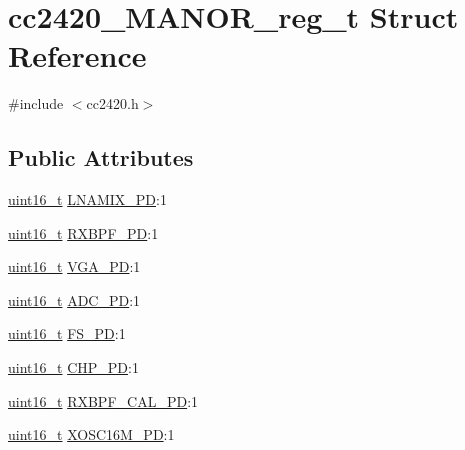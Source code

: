 \hypertarget{structcc2420___m_a_n_o_r__reg__t}{}\section{cc2420\+\_\+\+M\+A\+N\+O\+R\+\_\+reg\+\_\+t Struct Reference}
\label{structcc2420___m_a_n_o_r__reg__t}


{\ttfamily \#include $<$cc2420.\+h$>$}

\subsection*{Public Attributes}
\begin{DoxyCompactItemize}
\item 
\hyperlink{_p_e___types_8h_a1f1825b69244eb3ad2c7165ddc99c956}{uint16\+\_\+t} \hyperlink{structcc2420___m_a_n_o_r__reg__t_aa37050bc82f0bd9813fc5aee79f0946b}{L\+N\+A\+M\+I\+X\+\_\+\+PD}\+:1
\item 
\hyperlink{_p_e___types_8h_a1f1825b69244eb3ad2c7165ddc99c956}{uint16\+\_\+t} \hyperlink{structcc2420___m_a_n_o_r__reg__t_ab6fc443a13c0084b4a10cbcd4fc43e8d}{R\+X\+B\+P\+F\+\_\+\+PD}\+:1
\item 
\hyperlink{_p_e___types_8h_a1f1825b69244eb3ad2c7165ddc99c956}{uint16\+\_\+t} \hyperlink{structcc2420___m_a_n_o_r__reg__t_a49de9e54c918acb5f43ce06b062128c3}{V\+G\+A\+\_\+\+PD}\+:1
\item 
\hyperlink{_p_e___types_8h_a1f1825b69244eb3ad2c7165ddc99c956}{uint16\+\_\+t} \hyperlink{structcc2420___m_a_n_o_r__reg__t_a00ea066dac6d968b8ed582477ec31149}{A\+D\+C\+\_\+\+PD}\+:1
\item 
\hyperlink{_p_e___types_8h_a1f1825b69244eb3ad2c7165ddc99c956}{uint16\+\_\+t} \hyperlink{structcc2420___m_a_n_o_r__reg__t_a1b0877e56d312aa63e842a4c9a469640}{F\+S\+\_\+\+PD}\+:1
\item 
\hyperlink{_p_e___types_8h_a1f1825b69244eb3ad2c7165ddc99c956}{uint16\+\_\+t} \hyperlink{structcc2420___m_a_n_o_r__reg__t_af76278d85244bce83b1092f640bf295e}{C\+H\+P\+\_\+\+PD}\+:1
\item 
\hyperlink{_p_e___types_8h_a1f1825b69244eb3ad2c7165ddc99c956}{uint16\+\_\+t} \hyperlink{structcc2420___m_a_n_o_r__reg__t_a971a1911726af6d5430a64794535aa19}{R\+X\+B\+P\+F\+\_\+\+C\+A\+L\+\_\+\+PD}\+:1
\item 
\hyperlink{_p_e___types_8h_a1f1825b69244eb3ad2c7165ddc99c956}{uint16\+\_\+t} \hyperlink{structcc2420___m_a_n_o_r__reg__t_a65b9c3b2a1362215e9d3045ed74dcd1d}{X\+O\+S\+C16\+M\+\_\+\+PD}\+:1

\end{DoxyCompactItemize}

